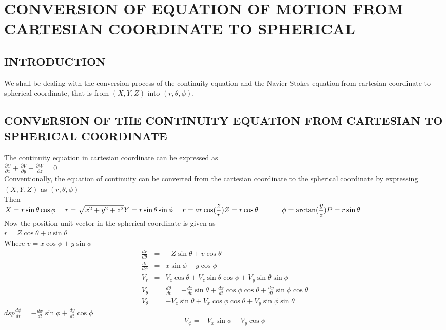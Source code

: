\documentclass[a4paper, 12pt]{report}
\newcommand{\sps}{\\[0.2cm]}
\newcommand{\spn}[1]{\\[#1cm]}
\newcommand{\NI}{\noindent}
\newcommand{\dsp}{\displaystyle}
\begin{document}
\chapter{CONVERSION OF EQUATION OF MOTION FROM CARTESIAN COORDINATE TO SPHERICAL}
\section{INTRODUCTION}
We shall be dealing with the conversion process of the continuity equation and the Navier-Stokes equation from cartesian coordinate to spherical coordinate, that is from $(X,Y,Z)$ into $(r,\theta, \phi)$.

\section{CONVERSION OF THE CONTINUITY EQUATION FROM CARTESIAN TO SPHERICAL COORDINATE}
The continuity equation in cartesian coordinate can be expressed as\sps $\dsp \frac{\partial U}{\partial x} + \frac{\partial V}{\partial y} + \frac{\partial W}{\partial z} = 0$\\

\NI Conventionally, the equation of continuity can be converted from the cartesian coordinate to the spherical coordinate by expressing $(X,Y,Z)$ as $(r, \theta, \phi)$\sps
Then\sps
$\dsp 
X = r\sin\theta\cos\phi ~~~~ r = \sqrt{x^2 + y^2 + z^2}\sps
Y = r\sin\theta\sin\phi ~~~~ r = ar\cos(\frac{z}{r})\sps
Z = r\cos \theta \qquad\quad~ \phi = \arctan(\frac{y}{z})\sps
P = r\sin \theta
$\sps 
Now the position unit vector in the spherical coordinate is given as \\
$r = Z\cos\theta + v\sin\theta$\sps
Where $v = x\cos\phi + y\sin\phi$
\begin{eqnarray}
	\frac{dr}{d\theta} &=& -Z\sin\theta + v\cos\theta\label{eq:4_1}\spn{0.5}
	\frac{dv}{d\phi} &=& x\sin\phi + y\cos\phi\label{eq:4_2} \spn{0.5}
	V_r &=& V_z\cos\theta + V_z\sin\theta\cos\phi + V_y\sin\theta\sin\phi \label{eq:4_3}\spn{0.5}
	V_\theta &=& \frac{d\theta}{dt} = - \frac{dz}{dt}\sin\theta + \frac{dx}{dt}\cos\phi\cos\theta + \frac{dy}{dt}\sin\phi\cos\theta \label{eq:4_4} \spn{0.5}
	V_\theta &=& -V_z\sin\theta + V_x\cos\phi\cos\theta + V_y\sin\phi\sin\theta \label{eq:4_5}
\end{eqnarray}
$dsp \frac{d\phi}{dt} = -\frac{dx}{dt}\sin\phi + \frac{dy}{dt}\cos\phi$\spn{0.5}
\begin{equation}
	V_\phi = -V_x\sin\phi + V_y\cos\phi \label{eq:4_6}
\end{equation}
\end{document}
